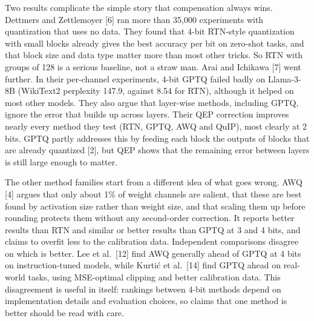 \documentclass[10pt,twocolumn]{article}
\begin{document}
Two results complicate the simple story that compensation always wins.
Dettmers and Zettlemoyer [6] ran more than 35,000 experiments with
quantization that uses no data. They found that 4-bit RTN-style
quantization with small blocks already gives the best accuracy per bit
on zero-shot tasks, and that block size and data type matter more than
most other tricks. So RTN with groups of 128 is a serious baseline, not
a straw man. Arai and Ichikawa [7] went further. In their per-channel
experiments, 4-bit GPTQ failed badly on Llama-3-8B (WikiText2
perplexity 147.9, against 8.54 for RTN), although it helped on most
other models. They also argue that layer-wise methods, including GPTQ,
ignore the error that builds up across layers. Their QEP correction
improves nearly every method they test (RTN, GPTQ, AWQ and QuIP), most
clearly at 2 bits. GPTQ partly addresses this by feeding each block the
outputs of blocks that are already quantized [2], but QEP shows that the
remaining error between layers is still large enough to matter.

The other method families start from a different idea of what goes
wrong. AWQ [4] argues that only about 1\% of weight channels are
salient, that these are best found by activation size rather than
weight size, and that scaling them up before rounding protects them
without any second-order correction. It reports better results than RTN
and similar or better results than GPTQ at 3 and 4 bits, and claims to
overfit less to the calibration data. Independent comparisons disagree
on which is better. Lee et al.~[12] find AWQ generally ahead of GPTQ at
4 bits on instruction-tuned models, while Kurtić et al.~[14] find GPTQ
ahead on real-world tasks, using MSE-optimal clipping and better
calibration data. This disagreement is useful in itself: rankings
between 4-bit methods depend on implementation details and evaluation
choices, so claims that one method is better should be read with care.
\end{document}
